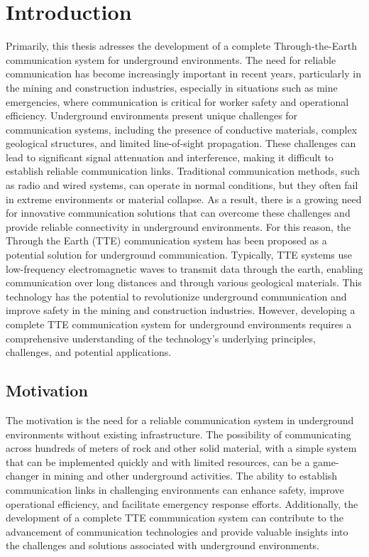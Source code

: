 \chapter{Introduction}\label{ch:intro}

Primarily, this thesis adresses the development of a complete Through-the-Earth communication system for underground environments. The need for reliable communication has become increasingly important in recent years, particularly in the mining and construction industries, especially in situations such as mine emergencies, where communication is critical for worker safety and operational efficiency. Underground environments present unique challenges for communication systems, including the presence of conductive materials, complex geological structures, and limited line-of-sight propagation. These challenges can lead to significant signal attenuation and interference, making it difficult to establish reliable communication links. Traditional communication methods, such as radio and wired systems, can operate in normal conditions, but they often fail in extreme environments or material collapse. As a result, there is a growing need for innovative communication solutions that can overcome these challenges and provide reliable connectivity in underground environments.
For this reason, the Through the Earth (TTE) communication system has been proposed as a potential solution for underground communication. Typically, TTE systems use low-frequency electromagnetic waves to transmit data through the earth, enabling communication over long distances and through various geological materials. This technology has the potential to revolutionize underground communication and improve safety in the mining and construction industries. However, developing a complete TTE communication system for underground environments requires a comprehensive understanding of the technology's underlying principles, challenges, and potential applications.

\section{Motivation}
The motivation is the need for a reliable communication system in underground environments without existing infrastructure. The possibility of communicating across hundreds of meters of rock and other solid material, with a simple system that can be implemented quickly and with limited resources, can be a game-changer in mining and other underground activities. The ability to establish communication links in challenging environments can enhance safety, improve operational efficiency, and facilitate emergency response efforts. Additionally, the development of a complete TTE communication system can contribute to the advancement of communication technologies and provide valuable insights into the challenges and solutions associated with underground environments.

